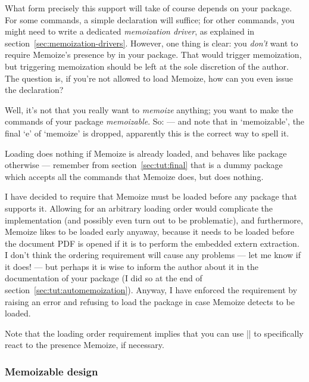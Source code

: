 \documentclass[a4paper,11pt]{article}
\begin{document}
What form precisely this support will take of course depends on your package.
For some commands, a simple  declaration will suffice; for other
commands, you might need to write a dedicated \emph{memoization driver}, as
explained in section~\ref{sec:memoization-drivers}.  However, one thing is
clear: you \emph{don't} want to require Memoize's presence by
 in your package.  That would
trigger memoization, but triggering memoization should be left at the sole
discretion of the author.  The question is, if you're not allowed to load
Memoize, how can you even issue the  declaration?

Well, it's not that you really want to \emph{memoize} anything; you want to
make the commands of your package \emph{memoizable}.  So:
 --- and note that in
`memoizable', the final `e' of `memoize' is dropped, apparently this is the
correct way to spell it.

Loading  does nothing if Memoize is already loaded, and
behaves like package  otherwise --- remember from
section~\ref{sec:tut:final} that  is a dummy package which
accepts all the commands that Memoize does, but does nothing.

I have decided to require that Memoize must be loaded before any package that
supports it.  Allowing for an arbitrary loading order would complicate the
implementation (and possibly even turn out to be problematic), and furthermore,
Memoize likes to be loaded early anyaway, because it needs to be loaded before
the document PDF is opened if it is to perform the embedded extern extraction.
I don't think the ordering requirement will cause any problems --- let me know
if it does!  --- but perhaps it is wise to inform the author about it in the
documentation of your package (I did so at the end of
section~\ref{sec:tut:automemoization}).  Anyway, I have enforced the
requirement by raising an error and refusing to load the package in case
Memoize detects  to be loaded.

Note that the loading order requirement implies that you can use
|| to specifically react to the presence Memoize, if
necessary.


\subsubsection{Memoizable design}
\label{sec:memoizable-design}
\end{document}
